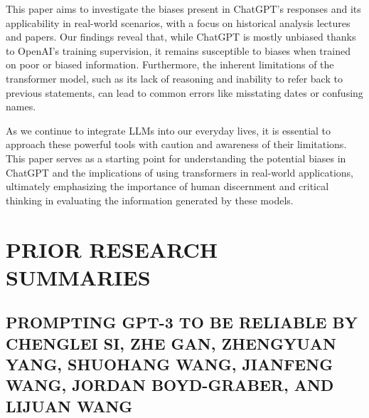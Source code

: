 \documentclass[letterpaper, 10pt, conference]{ieeeconf}
\begin{document}
    This paper aims to investigate the biases present in ChatGPT's responses and its applicability in real-world scenarios, with a focus on historical analysis lectures and papers. Our findings reveal that, while ChatGPT is mostly unbiased thanks to OpenAI's training supervision, it remains susceptible to biases when trained on poor or biased information. Furthermore, the inherent limitations of the transformer model, such as its lack of reasoning and inability to refer back to previous statements, can lead to common errors like misstating dates or confusing names.
    
    As we continue to integrate LLMs into our everyday lives, it is essential to approach these powerful tools with caution and awareness of their limitations. This paper serves as a starting point for understanding the potential biases in ChatGPT and the implications of using transformers in real-world applications, ultimately emphasizing the importance of human discernment and critical thinking in evaluating the information generated by these models. 
    \section{PRIOR RESEARCH SUMMARIES}
    \subsection{PROMPTING GPT-3 TO BE RELIABLE BY CHENGLEI SI, ZHE GAN, ZHENGYUAN YANG, SHUOHANG WANG, JIANFENG WANG, JORDAN BOYD-GRABER, AND LIJUAN WANG}
\end{document}

